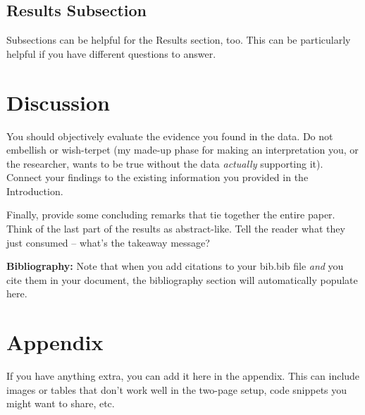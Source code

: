 \documentclass{article}\usepackage[]{graphicx}\usepackage[]{xcolor}
\begin{document}
\begin{multicols}{2}
\subsection{Results Subsection}
Subsections can be helpful for the Results section, too. This can be particularly helpful if you have different questions to answer. 


\section{Discussion}
 You should objectively evaluate the evidence you found in the data. Do not embellish or wish-terpet (my made-up phase for making an interpretation you, or the researcher, wants to be true without the data \emph{actually} supporting it). Connect your findings to the existing information you provided in the Introduction.

Finally, provide some concluding remarks that tie together the entire paper. Think of the last part of the results as abstract-like. Tell the reader what they just consumed -- what's the takeaway message?

\vspace{2em}

\noindent\textbf{Bibliography:} Note that when you add citations to your bib.bib file \emph{and}
you cite them in your document, the bibliography section will automatically populate here.

\begin{tiny}

\end{tiny}
\end{multicols}

\newpage
\onecolumn
\section{Appendix}

If you have anything extra, you can add it here in the appendix. This can include images or tables that don't work well in the two-page setup, code snippets you might want to share, etc.
\end{document}
